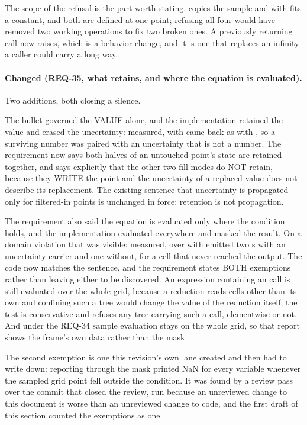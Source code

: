 The scope of the refusal is the part worth stating. 
copies the sample and  with  fits a
constant, and both are defined at one point; refusing all four would
have removed two working operations to fix two broken ones. A previously
returning call now raises, which is a behavior change, and it is one
that replaces an infinity a caller could carry a long way.

\paragraph{Changed (REQ-35, what  retains, and where the
equation is evaluated).} Two additions, both closing a silence.

The  bullet governed the VALUE alone, and the
implementation retained the value and erased the uncertainty: measured,
 with  came back as
 with , so a surviving
number was paired with an uncertainty that is not a number. The
requirement now says both halves of an untouched point's state are
retained together, and says explicitly that the other two fill modes do
NOT retain, because they WRITE the point and the uncertainty of a
replaced value does not describe its replacement. The existing sentence
that uncertainty is propagated only for filtered-in points is unchanged
in force: retention is not propagation.

The requirement also said the equation is evaluated only where the
condition holds, and the implementation evaluated everywhere and masked
the result. On a domain violation that was visible: measured,  over  with  emitted two
s with an uncertainty carrier and one without, for
a cell that never reached the output. The code now matches the sentence,
and the requirement states BOTH exemptions rather than leaving either to
be discovered. An expression containing an  call is still
evaluated over the whole grid, because a reduction reads cells other
than its own and confining such a tree would change the value of the
reduction itself; the test is conservative and refuses any tree carrying
such a call, elementwise or not. And under  the REQ-34
sample evaluation stays on the whole grid, so that report shows the
frame's own data rather than the mask.

The second exemption is one this revision's own lane created and then
had to write down: reporting through the mask printed NaN for every
variable whenever the sampled grid point fell outside the condition. It
was found by a review pass over the commit that closed the review, run
because an unreviewed change to this document is worse than an
unreviewed change to code, and the first draft of this section counted
the exemptions as one.

